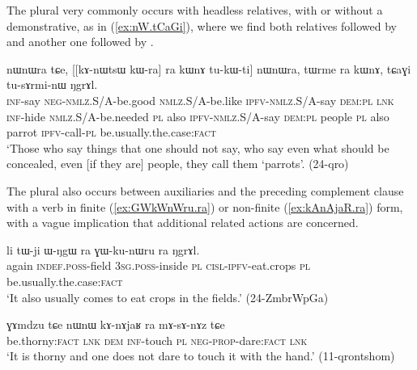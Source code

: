 The plural  very commonly occurs with headless relatives, with or without a demonstrative, as in (\ref{ex:nW.tCaGi}), where we find both relatives followed by  and another one followed by .

\begin{exe}
\ex \label{ex:nW.tCaGi}
\gll [kɤ-ti mɤ-kɯ-pe kɯ-fse tu-kɯ-ti] nɯnɯra tɕe, [[kɤ-nɯtsɯ kɯ-ra] ra kɯnɤ tu-kɯ-ti] nɯnɯra, 
tɯrme ra kɯnɤ, tɕaɣi tu-sɤrmi-nɯ ŋgrɤl.  \\
\textsc{inf}-say \textsc{neg}-\textsc{nmlz}.S/A-be.good \textsc{nmlz}.S/A-be.like \textsc{ipfv}-\textsc{nmlz}.S/A-say \textsc{dem}:\textsc{pl} \textsc{lnk} \textsc{inf}-hide \textsc{nmlz}.S/A-be.needed \textsc{pl} also \textsc{ipfv}-\textsc{nmlz}.S/A-say \textsc{dem}:\textsc{pl} people \textsc{pl} also  parrot \textsc{ipfv}-call-\textsc{pl} be.usually.the.case:\textsc{fact} \\
\glt `Those who say things that one should not say, who say even what should be concealed, even [if they are] people, they call them `parrots'. (24-qro)
\end{exe} 

 
The plural  also occurs between auxiliaries and the preceding complement clause with a verb in finite (\ref{ex:GWkWnWru.ra}) or non-finite (\ref{ex:kAnAjaR.ra}) form, with a vague implication that additional related actions are concerned.

\begin{exe}
\ex \label{ex:GWkWnWru.ra}
 \gll li tɯ-ji ɯ-ŋgɯ ra ɣɯ-ku-nɯru ra ŋgrɤl. \\
 again \textsc{indef}.\textsc{poss}-field \textsc{3sg}.\textsc{poss}-inside \textsc{pl} \textsc{cisl}-\textsc{ipfv}-eat.crops \textsc{pl} be.usually.the.case:\textsc{fact} \\
\glt `It also usually comes to eat crops in the fields.' (24-ZmbrWpGa) 
\end{exe}

\begin{exe}
\ex \label{ex:kAnAjaR.ra}
 \gll  ɣɤmdzu tɕe nɯnɯ kɤ-nɤjaʁ ra mɤ-sɤ-nɤz tɕe \\
be.thorny:\textsc{fact} \textsc{lnk} \textsc{dem} \textsc{inf}-touch \textsc{pl} \textsc{neg}-\textsc{prop}-dare:\textsc{fact} \textsc{lnk} \\
\glt `It is thorny and one does not dare to touch it with the hand.' (11-qrontshom) 
\end{exe}

